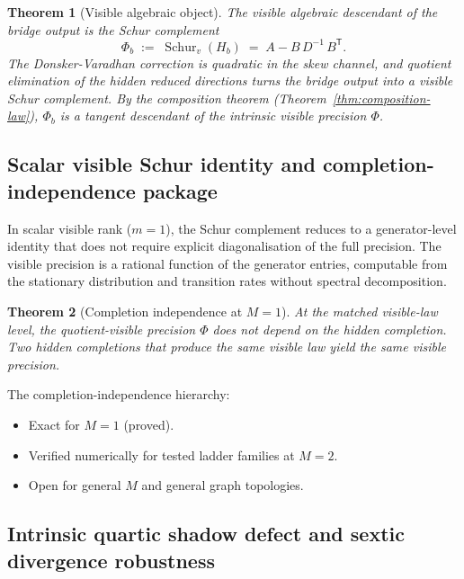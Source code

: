 \documentclass[11pt]{article}
\numberwithin{equation}{section}
\theoremstyle{thmcompact}
\newtheorem{theorem}{Theorem}[section]
\theoremstyle{remark}
\begin{document}
\begin{theorem}[Visible algebraic object]
\label{thm:visible-algebraic-object}
The visible algebraic descendant of the bridge output is the Schur complement
\begin{equation}
\Phi_b \;:=\; \operatorname{Schur}_v(H_b) \;=\; A - B\, D^{-1}\, B^{\mathsf T}.
\label{eq:phi-schur}
\end{equation}
The Donsker-Varadhan correction is quadratic in the skew channel, and quotient elimination of the hidden reduced directions turns the bridge output into a visible Schur complement. By the composition theorem (Theorem~\ref{thm:composition-law}), $\Phi_b$ is a tangent descendant of the intrinsic visible precision $\Phi$.
\end{theorem}

\subsection{Scalar visible Schur identity and completion-independence package}
\label{subsec:scalar-schur}

In scalar visible rank ($m = 1$), the Schur complement reduces to a generator-level identity that does not require explicit diagonalisation of the full precision. The visible precision is a rational function of the generator entries, computable from the stationary distribution and transition rates without spectral decomposition.

\begin{theorem}[Completion independence at $M=1$]
\label{thm:completion-independence}
At the matched visible-law level, the quotient-visible precision $\Phi$ does not depend on the hidden completion. Two hidden completions that produce the same visible law yield the same visible precision.
\end{theorem}

The completion-independence hierarchy:

\begin{itemize}
\item Exact for $M = 1$ (proved).
\item Verified numerically for tested ladder families at $M = 2$.
\item Open for general $M$ and general graph topologies.
\end{itemize}

\subsection{Intrinsic quartic shadow defect and sextic divergence robustness}
\end{document}
